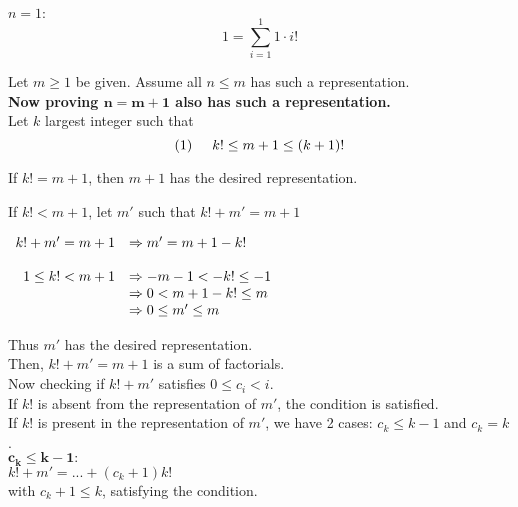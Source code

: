 \documentclass[a4paper, 11pt]{article}
\begin{document}
\begin{myEnumerate}
\begin{myEnumerate}
        \item
        $ n = 1: $
        $$ 1 = \sum_{i=1}^1 1 \cdot i! $$
        
        Let $m \geq 1$ be given. Assume all $n \leq m$ has such a representation. \\
        \textbf{Now proving $\mathbf{n = m + 1}$ also has such a representation.}\\
        
        Let $k$ largest integer such that
        $$(1) \hspace{0.5cm} k! \leq m + 1 \leq (k + 1)! $$
        
        If $k! = m + 1$, then $m + 1$ has the desired representation.
        
        If $k! < m + 1$, let $m'$ such that $k! + m' = m + 1$
        
        \( \\
        \begin{array}{rl}
        	k! + m' = m + 1   & \Rightarrow m' = m + 1 - k! \\\\
            1 \leq k! < m + 1 & \Rightarrow -m - 1 < -k! \leq -1 \\
            				  & \Rightarrow 0 < m + 1 - k! \leq m \\
                              & \Rightarrow 0 \leq m' \leq m
        \end{array} \\ \)
        
        Thus $m'$ has the desired representation. \\
        Then, $k! + m' = m + 1$ is a sum of factorials. \\
        
        Now checking if $k! + m'$ satisfies $0 \leq c_i < i$. \\
        
        If $k!$ is absent from the representation of $m'$, the condition is satisfied. \\
        
        If $k!$ is present in the representation of $m'$, we have 2 cases: $c_k \leq k - 1$ and $c_k = k$. \\
        
        $\mathbf{c_k \leq k - 1}:$ \\
        $k! + m' = ... + (c_k + 1)k!$ \\
        with $c_k + 1 \leq k$, satisfying the condition. \\
        

\end{myEnumerate}
\end{myEnumerate}
\end{document}
